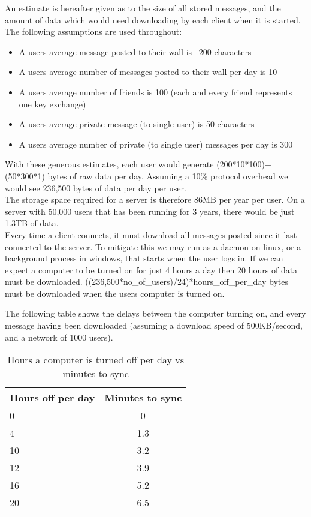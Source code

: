 An estimate is hereafter given as to the size of all stored messages, and the
amount of data which would need downloading by each client when it is started.
The following assumptions are used throughout:
\begin{itemize}
\item A users average message posted to their wall is ~200 characters
\item A users average number of messages posted to their wall per day is 10
\item A users average number of friends is 100 (each and every friend represents
one key exchange)
\item A users average private message (to single user) is 50 characters
\item A users average number of private (to single user) messages per day is 300
\end{itemize}
With these generous estimates, each user would generate (200*10*100)+(50*300*1)
bytes of raw data per day. Assuming a 10\% protocol overhead we would see
236,500 bytes of data per day per user.\\

The storage space required for a server is therefore 86MB per year per user. On a
server with 50,000 users that has been running for 3 years, there would be just
1.3TB of data.\\

Every time a client connects, it must download all messages posted since it last
connected to the server. To mitigate this we may run as a daemon on linux, or a
background process in windows, that starts when the user logs in. If we can
expect a computer to be turned on for just 4 hours a day then 20 hours of data
must be downloaded. ((236,500*no\_of\_users)/24)*hours\_off\_per\_day bytes must
be downloaded when the users computer is turned on.

The following table shows the delays between the computer turning on, and every
message having been downloaded (assuming a download speed of 500KB/second, and a
network of 1000 users).

\begin{table}[h]
    \centering
    \begin{tabular}{lc}
    Hours off per day & Minutes to sync       \\ \hline
    0                 &  0 \\
    4                 &  1.3\\
    10                &  3.2\\
    12                &  3.9\\
    16                &  5.2\\
    20                &  6.5\\
    \end{tabular}
    \caption{Hours a computer is turned off per day vs minutes to sync}
\end{table}

